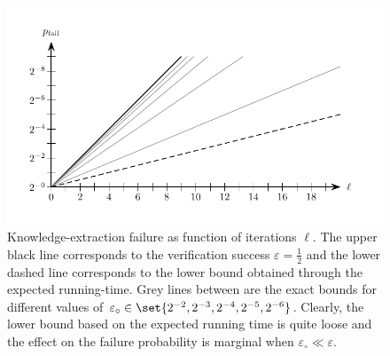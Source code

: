 \documentclass{crypto-exercise}
\begin{document}
\begin{solution}
\begin{figure}[!h]
   \centering
   \includegraphics[scale=0.85]{figures/1106-knowledge-extraction-failure-i}
   \caption{Knowledge-extraction failure as function of iterations $\ell$. The upper black line corresponds to the verification success $\varepsilon=\frac{1}{2}$ and the lower dashed line corresponds to the lower bound obtained through the expected running-time. Grey lines between are the exact bounds for different values of $\varepsilon_\circ\in\set{2^{-2},2^{-3}, 2^{-4}, 2^{-5}, 2^{-6}}$. Clearly, the lower bound based on the expected running time is quite loose and the effect on the failure probability is marginal when $\varepsilon_\circ\ll \varepsilon$.}
   \label{fig:knowledge-extraction-failure-bounds}
\end{figure}



\end{solution}
\end{document}

